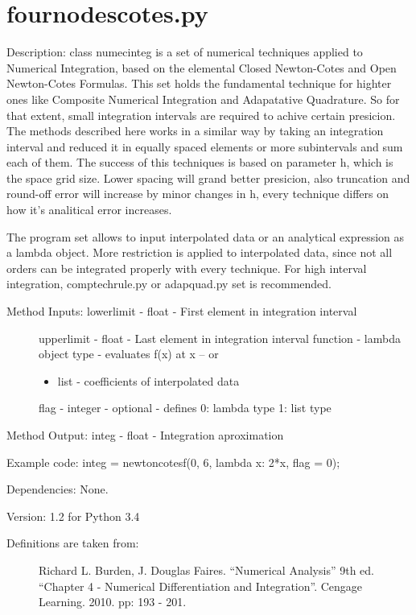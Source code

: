\documentclass[letterpaper,10pt,oneside]{sphinxmanual}
\theoremstyle{plain}%
\theoremstyle{definition}%
\theoremstyle{remark}%
\begin{document}
\section{fournodescotes.py}
\label{code:fournodescotes-py}\label{code:module-fournodescotes}
Description: class numecinteg is a set of numerical techniques applied to
Numerical Integration, based on the elemental Closed Newton-Cotes and
Open Newton-Cotes Formulas. This set holds the fundamental technique for
highter ones like Composite Numerical Integration and Adapatative Quadrature.
So for that extent, small integration intervals are required to achive certain
presicion. The methods described here works in a similar way by taking an
integration interval and reduced it in equally spaced elements or more 
subintervals and sum each of them. The success of this techniques is based
on parameter h, which is the space grid size. Lower spacing will grand better
presicion, also truncation and round-off error will increase by minor changes
in h, every technique differs on how it's analitical error increases.

The program set allows to input interpolated data or an analytical expression
as a lambda object. More restriction is applied to interpolated data, since
not all orders can be integrated properly with every technique. For high 
interval integration, comptechrule.py or adapquad.py set is recommended.
\begin{description}
\item[{Method Inputs: lowerlimit - float - First element in integration interval}] \leavevmode
upperlimit - float - Last element in integration interval
function - lambda object type - evaluates f(x) at x -- or
\begin{itemize}
\item {} 
list - coefficients of interpolated data

\end{itemize}

flag - integer - optional - defines 0: lambda type 1: list type

\end{description}

Method Output: integ - float - Integration aproximation

Example code: integ = newtoncotesf(0, 6, lambda x: 2*x, flag = 0);

Dependencies: None.

Version: 1.2 for Python 3.4
\begin{description}
\item[{Definitions are taken from:}] \leavevmode
Richard L. Burden, J. Douglas Faires. ``Numerical Analysis'' 9th ed.
``Chapter 4 - Numerical Differentiation and Integration''. 
Cengage Learning. 2010. pp: 193 - 201.

\end{description}
\end{document}

